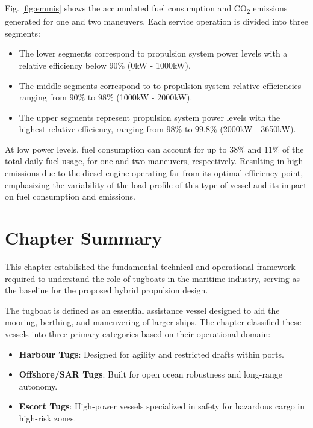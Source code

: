 Fig. \ref{fig:emmis} shows the accumulated fuel consumption and CO\textsubscript{2} emissions generated for one and two maneuvers. Each service operation is divided into three segments:

\begin{itemize}
	\item The lower segments correspond to propulsion system power levels with a relative efficiency below $90\%$ (0kW - 1000kW).
	\item The middle segments correspond to to propulsion system relative efficiencies ranging from $90\%$ to $98\%$ (1000kW - 2000kW).
	\item The upper segments represent propulsion system power levels with the highest relative efficiency, ranging from $98\%$ to $99.8\%$ (2000kW - 3650kW). 
\end{itemize}

At low power levels, fuel consumption can account for up to $38\%$ and $11\%$ of the total daily fuel usage, for one and two maneuvers, respectively. Resulting in high emissions due to the diesel engine operating far from its optimal efficiency point, emphasizing the variability of the load profile of this type of vessel and its impact on fuel consumption and emissions. 
 
\section{Chapter Summary}


This chapter established the fundamental technical and operational framework required to understand the role of tugboats in the maritime industry, serving as the baseline for the proposed hybrid propulsion design.


The tugboat is defined as an essential assistance vessel designed to aid the mooring, berthing, and maneuvering of larger ships. The chapter classified these vessels into three primary categories based on their operational domain:

\begin{itemize}
	\item \textbf{Harbour Tugs}: Designed for agility and restricted drafts within ports.
	\item \textbf{Offshore/SAR Tugs}: Built for open ocean robustness and long-range autonomy.
	\item \textbf{Escort Tugs}: High-power vessels specialized in safety for hazardous cargo in high-risk zones.
\end{itemize}


